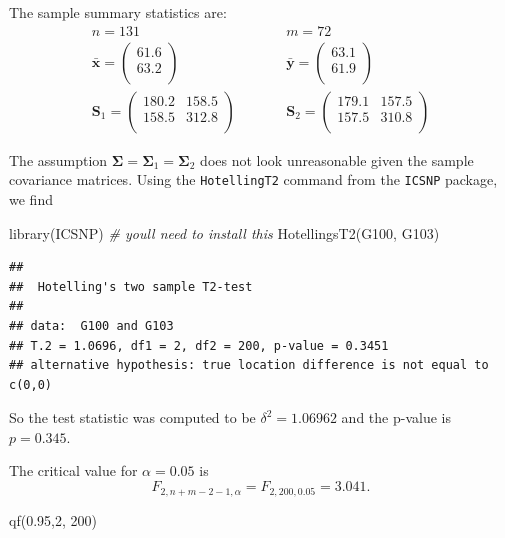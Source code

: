 \documentclass[
]{book}
\newenvironment{Shaded}{\begin{snugshade}}{\end{snugshade}}
\newcommand{\CommentTok}[1]{\textcolor[rgb]{0.56,0.35,0.01}{\textit{#1}}}
\newcommand{\DecValTok}[1]{\textcolor[rgb]{0.00,0.00,0.81}{#1}}
\newcommand{\FloatTok}[1]{\textcolor[rgb]{0.00,0.00,0.81}{#1}}
\newcommand{\FunctionTok}[1]{\textcolor[rgb]{0.00,0.00,0.00}{#1}}
\newcommand{\NormalTok}[1]{#1}
\theoremstyle{definition}
\theoremstyle{definition}
\theoremstyle{definition}
\theoremstyle{definition}
\theoremstyle{remark}
\begin{document}
The sample summary statistics are:
\begin{eqnarray*}
n = 131 &\quad& m = 72 \\
\bar{\mathbf x} = \begin{pmatrix}61.6 \\63.2 \\\end{pmatrix}&\quad& \bar{\mathbf y}= \begin{pmatrix}63.1 \\61.9 \\\end{pmatrix}\\
\mathbf S_1 = \begin{pmatrix}180.2&158.5 \\158.5&312.8 \\\end{pmatrix} &\qquad& \mathbf S_2 = \begin{pmatrix}179.1&157.5 \\157.5&310.8 \\\end{pmatrix}
\end{eqnarray*}

The assumption \(\boldsymbol{\Sigma}= \boldsymbol{\Sigma}_1 = \boldsymbol{\Sigma}_2\) does not look unreasonable given the sample covariance matrices. Using the \texttt{HotellingT2} command from the \texttt{ICSNP} package, we find

\begin{Shaded}
\begin{Highlighting}[]
\FunctionTok{library}\NormalTok{(ICSNP) }\CommentTok{\# you\textquotesingle{}ll need to install this}
\FunctionTok{HotellingsT2}\NormalTok{(G100, G103)}
\end{Highlighting}
\end{Shaded}

\begin{verbatim}
## 
##  Hotelling's two sample T2-test
## 
## data:  G100 and G103
## T.2 = 1.0696, df1 = 2, df2 = 200, p-value = 0.3451
## alternative hypothesis: true location difference is not equal to c(0,0)
\end{verbatim}

So the test statistic was computed to be \(\delta^2 = 1.06962\) and the p-value is \(p= 0.345\).

The critical value for \(\alpha=0.05\) is
\[F_{2,n+m-2-1,\alpha} = F_{2,200,0.05} = 3.041.\]

\begin{Shaded}
\begin{Highlighting}[]
\FunctionTok{qf}\NormalTok{(}\FloatTok{0.95}\NormalTok{,}\DecValTok{2}\NormalTok{, }\DecValTok{200}\NormalTok{)}
\end{Highlighting}
\end{Shaded}
\end{document}
